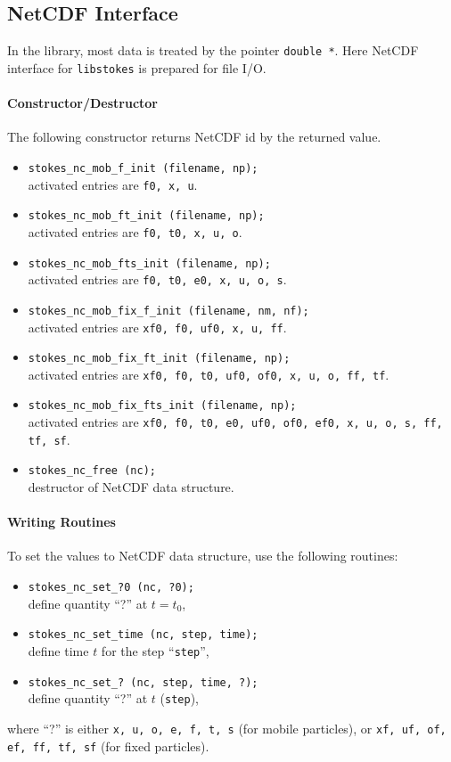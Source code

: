 \documentclass{book}
\begin{document}
\subsection{NetCDF Interface}
In the library, most data is treated by the pointer
{\tt double *}. Here NetCDF interface for {\tt libstokes}
is prepared for file I/O.

\paragraph{Constructor/Destructor}
The following constructor returns NetCDF id by the returned value.
\begin{itemize}
\item {\tt stokes\_nc\_mob\_f\_init (filename, np);}\\
  activated entries are {\tt f0, x, u}.
\item {\tt stokes\_nc\_mob\_ft\_init (filename, np);}\\
  activated entries are {\tt f0, t0, x, u, o}.
\item {\tt stokes\_nc\_mob\_fts\_init (filename, np);}\\
  activated entries are {\tt f0, t0, e0, x, u, o, s}.
\item {\tt stokes\_nc\_mob\_fix\_f\_init (filename, nm, nf);}\\
  activated entries are {\tt xf0, f0, uf0, x, u, ff}.
\item {\tt stokes\_nc\_mob\_fix\_ft\_init (filename, np);}\\
  activated entries are {\tt xf0, f0, t0, uf0, of0, x, u, o, ff, tf}.
\item {\tt stokes\_nc\_mob\_fix\_fts\_init (filename, np);}\\
  activated entries are {\tt xf0, f0, t0, e0, uf0, of0, ef0,
  x, u, o, s, ff, tf, sf}.
\item {\tt stokes\_nc\_free (nc);}\\
  destructor of NetCDF data structure.
\end{itemize}


\paragraph{Writing Routines}
To set the values to NetCDF data structure,
use the following routines:
\begin{itemize}
\item {\tt stokes\_nc\_set\_?0 (nc, ?0);}\\
    define quantity ``?'' at $t=t_0$,
\item {\tt stokes\_nc\_set\_time (nc, step, time);}\\
    define time $t$ for the step ``{\tt step}'',
\item {\tt stokes\_nc\_set\_? (nc, step, time, ?);}\\
    define quantity ``?'' at $t$ ({\tt step}),
\end{itemize}
where ``?'' is either
{\tt x, u, o, e, f, t, s} (for mobile particles), or
{\tt xf, uf, of, ef, ff, tf, sf} (for fixed particles).
\end{document}

